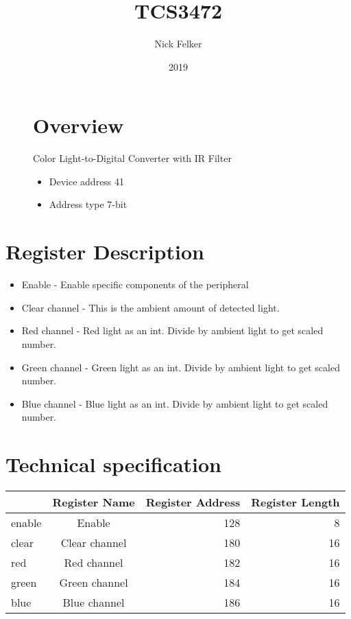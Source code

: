 \documentclass[a4paper,12pt,oneside,pdflatex,italian,final,twocolumn]{article}
\title{ TCS3472 }
\author{ Nick Felker }
\date{ 2019 }
\begin{document}
\pagestyle{fancy}



\onecolumn


\begin{figure}
\begin{minipage}{0.47\textwidth}

\section{Overview}
    Color Light-to-Digital Converter with IR Filter
    \begin{itemize}
        \item Device address 41
        \item Address type 7-bit
    \end{itemize}


\end{minipage}
\hfill

\end{figure}


\section{Register Description}
\begin{itemize}
\item Enable - Enable specific components of the peripheral
\item Clear channel - This is the ambient amount of detected light.
\item Red channel - Red light as an int. Divide by ambient light to get scaled number.
\item Green channel - Green light as an int. Divide by ambient light to get scaled number.
\item Blue channel - Blue light as an int. Divide by ambient light to get scaled number.
\end{itemize}

\section{Technical specification}
\centering
\begin{tabular}{lcrr}
\toprule
 & Register Name & Register Address & Register Length \\
\midrule
enable & Enable & 128 & 8 \\
clear & Clear channel & 180 & 16 \\
red & Red channel & 182 & 16 \\
green & Green channel & 184 & 16 \\
blue & Blue channel & 186 & 16 \\
\bottomrule
\end{tabular}
\end{document}
